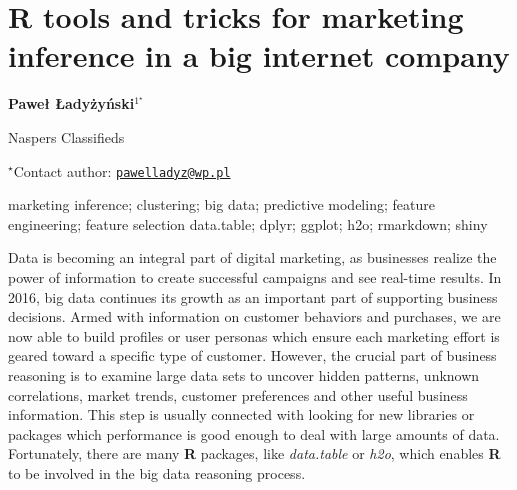 

\section{R tools and tricks for marketing inference in a big internet company}

\begin{center}
  {\bf Paweł Ładyżyński$^{1^\star}$}
\end{center}

\vskip 0.3cm

\begin{affiliations}
\begin{enumerate}
\begin{minipage}{0.915\textwidth}
\centering
\item Naspers Classifieds \\[-2pt]
\end{minipage}
\end{enumerate}
$^\star$Contact author: \href{mailto:pawelladyz@wp.pl}{\nolinkurl{pawelladyz@wp.pl}}\\
\end{affiliations}

\vskip 0.5cm

\begin{minipage}{0.915\textwidth}
\keywords marketing inference; clustering; big data; predictive modeling; feature
engineering; feature selection
\packages data.table; dplyr; ggplot; h2o; rmarkdown; shiny
\end{minipage}

\vskip 0.8cm

Data is becoming an integral part of digital marketing, as businesses
realize the power of information to create successful campaigns and see
real-time results. In 2016, big data continues its growth as an
important part of supporting business decisions. Armed with information
on customer behaviors and purchases, we are now able to build profiles
or user personas which ensure each marketing effort is geared toward a
specific type of customer. However, the crucial part of business
reasoning is to examine large data sets to uncover hidden patterns,
unknown correlations, market trends, customer preferences and other
useful business information. This step is usually connected with looking
for new libraries or packages which performance is good enough to deal
with large amounts of data. Fortunately, there are many \textbf{R}
packages, like \emph{data.table} or \emph{h2o}, which enables \textbf{R}
to be involved in the big data reasoning process.


